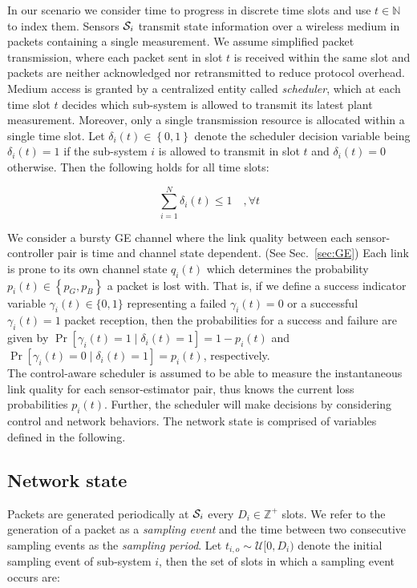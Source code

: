 In our scenario we consider time to progress in discrete time slots and use $t
\in \mathbb{N}$ to index them. Sensors $\mathcal{S}_i$ transmit state information over
a wireless medium in packets containing a single measurement. We assume
simplified packet transmission, where each packet sent in slot $t$ is received
within the same slot and packets are neither acknowledged nor retransmitted to
reduce protocol overhead. Medium access is granted by a centralized entity
called \textit{scheduler}, which at each time slot $t$ decides which sub-system
is allowed to transmit its latest plant measurement. Moreover, only a single
transmission resource is allocated within a single time slot. Let $\delta_i(t)
\in \left\{0,1\right\}$ denote the scheduler decision variable being
$\delta_i(t)=1$ if the sub-system $i$ is allowed to transmit in slot $t$ and
$\delta_i(t)=0$ otherwise. Then the following holds for all time slots:

\begin{equation}
  \sum_{i=1}^{N}{\delta_i(t) \leq 1 \quad, \forall t}
\end{equation}

We consider a bursty GE channel where the link quality between each
sensor-controller pair is time and channel state dependent. (See
Sec.~{\ref{sec:GE}}) Each link is prone to its own channel state $q_i(t)$ which
determines the probability $p_i(t) \in \left\{p_G,p_B\right\}$ a packet is lost
with. That is, if we define a success indicator variable $\gamma_i(t)\in\{0,1\}$
representing a failed $\gamma_i(t)=0$ or a successful $\gamma_i(t)=1$ packet
reception, then the probabilities for a success and failure are given by
$\Pr[\gamma_i(t)=1 \mid \delta_i(t)=1] = 1-p_i(t)$ and  $\Pr[\gamma_i(t)=0 \mid
\delta_i(t)=1] = p_i(t)$, respectively. \\ 
The control-aware scheduler is assumed to be able to measure the instantaneous
link quality for each sensor-estimator pair, thus knows the current loss
probabilities $p_i(t)$. Further, the scheduler will make decisions by
considering control and network behaviors. The network state is comprised of
variables defined in the following.

\subsection{Network state}

Packets are generated periodically at $\mathcal{S}_i$ every $D_i \in \mathbb{Z}^+$
slots. We refer to the generation of a packet as a \textit{sampling event} and
the time between two consecutive sampling events as the \textit{sampling
period}. Let $t_{i,o} \sim \mathcal{U}[0, D_i)$ denote the initial sampling
event of sub-system $i$, then the set of slots in which a sampling event occurs
are:

